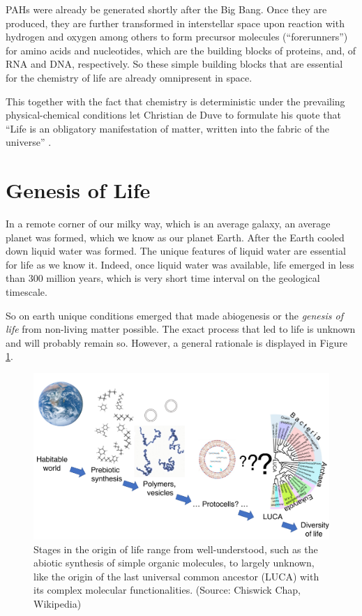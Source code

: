\documentclass[
  11pt,
]{book}
\begin{document}
PAHs were already be generated shortly after the Big Bang. Once they are produced, they are further transformed in interstellar space upon reaction with hydrogen and oxygen among others to form precursor molecules (``forerunners'') for amino acids and nucleotides, which are the building blocks of proteins, and, of RNA and DNA, respectively. So these simple building blocks that are essential for the chemistry of life are already omnipresent in space.

This together with the fact that chemistry is deterministic under the prevailing physical-chemical conditions let Christian de Duve to formulate his quote that ``Life is an obligatory manifestation of matter, written into the fabric of the universe'' \citep{deDuve2002}.

\hypertarget{genesis-of-life}{%
\section{Genesis of Life}\label{genesis-of-life}}

In a remote corner of our milky way, which is an average galaxy, an average planet was formed, which we know as our planet Earth.
After the Earth cooled down liquid water was formed. The unique features of liquid water are essential for life as we know it.
Indeed, once liquid water was available, life emerged in less than 300 million years, which is very short time interval on the geological timescale.

So on earth unique conditions emerged that made abiogenesis or the \emph{genesis of life} from non-living matter possible. The exact process that led to life is unknown and will probably remain so.
However, a general rationale is displayed in Figure \ref{fig:originOfLife}.

\begin{figure}

{\centering \includegraphics[width=1\linewidth]{./figs/origin_of_life_stages} 

}

\caption{Stages in the origin of life range from well-understood, such as the abiotic synthesis of simple organic molecules, to largely unknown, like the origin of the last universal common ancestor (LUCA) with its complex molecular functionalities. (Source: Chiswick Chap, Wikipedia)}\label{fig:originOfLife}
\end{figure}
\end{document}

